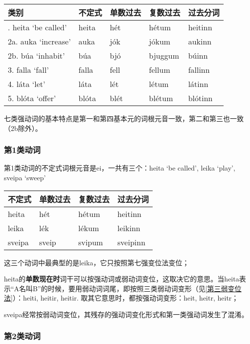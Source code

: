 \begin{longtable}{lllll}
    \toprule
    类别                 & 不定式 & 单数过去 & 复数过去 & 过去分词 \\
    \midrule
    \endhead
    \bottomrule
    \endfoot
    1. heita `be called‌' & heita  & hét      & hétum    & heitinn  \\
    2a. auka `increase‌'  & auka   & jók      & jókum    & aukinn   \\
    2b. búa `inhabit‌'    & búa    & bjó      & bjuggum  & búinn    \\
    3. falla `fall‌'      & falla  & fell     & fellum   & fallinn  \\
    4. láta `let‌'        & láta   & lét      & létum    & látinn   \\
    5. blóta `offer‌'     & blóta  & blét     & blétum   & blótinn  \\
\end{longtable}

七类强动词的基本特点是第一和第四基本元的词根元音一致，第二和第三也一致（2b除外）。

\subsubsection{第1类动词}

第1类动词的不定式词根元音是ei，一共有三个：heita `be called', leika
`play', sveipa `sweep'

\begin{longtable}{llll}
    \toprule
    不定式 & 单数过去 & 复数过去 & 过去分词 \\
    \midrule
    \endhead
    \bottomrule
    \endfoot
    heita  & hét      & hétum    & heitinn  \\
    leika  & lék      & lékum    & leikinn  \\
    sveipa & sveip    & svipum   & sveipinn \\
\end{longtable}

这三个动词中最典型的是leika，它只按照第七强变位法变位；

heita的\textbf{单数现在时}词干可以按强动词或弱动词变位，这取决它的意思。当heita表示“A名叫B”的时候，要用弱动词词尾，即按照三类弱动词变形（见\ref{第三弱变位法}）：heiti, heitir, heitir. 取其它意思时，都按强动词变形：heit, heitr, heitr；

sveipa经常按弱动词变位，其残存的强动词变化形式和第一类强动词发生了混淆。

\subsubsection{第2类动词}

